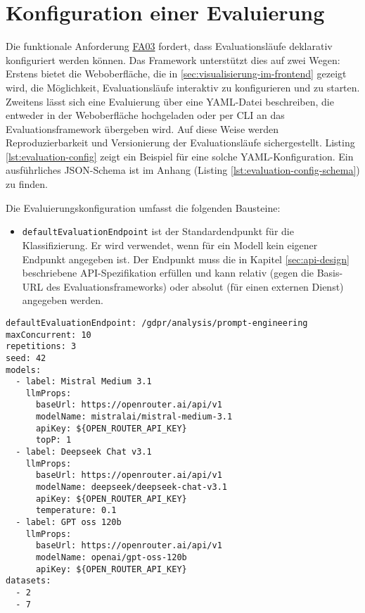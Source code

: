 \section{Konfiguration einer Evaluierung}\label{sec:konfiguration-einer-evaluierung}

Die funktionale Anforderung \hyperlink{FA03}{FA03} fordert, dass Evaluationsläufe deklarativ konfiguriert werden können. Das Framework unterstützt dies auf zwei Wegen:
Erstens bietet die Weboberfläche, die in \ref{sec:visualisierung-im-frontend} gezeigt wird, die Möglichkeit, Evaluationsläufe interaktiv zu konfigurieren und zu starten.
Zweitens lässt sich eine Evaluierung über eine YAML-Datei beschreiben, die entweder in der Weboberfläche hochgeladen oder per CLI an das Evaluationsframework übergeben wird. Auf diese Weise werden Reproduzierbarkeit und Versionierung der Evaluationsläufe sichergestellt. Listing \ref{lst:evaluation-config} zeigt ein Beispiel für eine solche YAML-Konfiguration. Ein ausführliches JSON-Schema ist im Anhang (Listing \ref{lst:evaluation-config-schema}) zu finden.

Die Evaluierungskonfiguration umfasst die folgenden Bausteine:

\begin{itemize}
    \item \texttt{defaultEvaluationEndpoint} ist der Standardendpunkt für die Klassifizierung. Er wird verwendet, wenn für ein Modell kein eigener Endpunkt angegeben ist. Der Endpunkt muss die in Kapitel \ref{sec:api-design} beschriebene API-Spezifikation erfüllen und kann relativ (gegen die Basis-URL des Evaluationsframeworks) oder absolut (für einen externen Dienst) angegeben werden.
\end{itemize}

\begin{lstlisting}[caption={Beispiel einer Evaluierungskonfiguration in YAML.},label={lst:evaluation-config}]
defaultEvaluationEndpoint: /gdpr/analysis/prompt-engineering
maxConcurrent: 10
repetitions: 3
seed: 42
models:
  - label: Mistral Medium 3.1
    llmProps:
      baseUrl: https://openrouter.ai/api/v1
      modelName: mistralai/mistral-medium-3.1
      apiKey: ${OPEN_ROUTER_API_KEY}
      topP: 1
  - label: Deepseek Chat v3.1
    llmProps:
      baseUrl: https://openrouter.ai/api/v1
      modelName: deepseek/deepseek-chat-v3.1
      apiKey: ${OPEN_ROUTER_API_KEY}
      temperature: 0.1
  - label: GPT oss 120b
    llmProps:
      baseUrl: https://openrouter.ai/api/v1
      modelName: openai/gpt-oss-120b
      apiKey: ${OPEN_ROUTER_API_KEY}
datasets:
  - 2
  - 7
\end{lstlisting}

